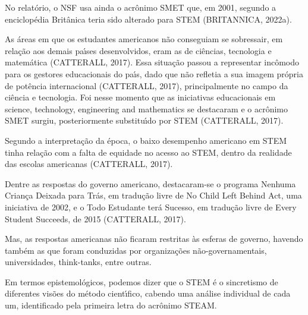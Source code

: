 \documentclass[
12pt,		%
openright,	%
twoside,  %
a4paper,			%
chapter=TITLE,		%
english,			%
french,				%
spanish,			%
brazil				%
]{USPSC-classe/USPSC}
\begin{document}
No relat\'orio, o NSF usa ainda o acr\^onimo SMET que, em 2001, segundo a enciclop\'edia Brit\^anica teria sido alterado para STEM (BRITANNICA, 2022a).








As \'areas em que os estudantes americanos n\~ao conseguiam se sobressair, em rela\c{c}\~ao aos demais pa\'{\i}ses desenvolvidos, eram as de ci\^encias, tecnologia e matem\'atica  (CATTERALL, 2017). Essa situa\c{c}\~ao passou a representar inc\^omodo para os gestores educacionais do pa\'{\i}s, dado que n\~ao refletia a sua imagem pr\'opria de pot\^encia internacional  (CATTERALL, 2017), principalmente no campo da ci\^encia e tecnologia. Foi nesse momento que as iniciativas educacionais em \textquotedbl science, technology, engineering and mathematics se destacaram e o acr\^onimo SMET surgiu, posteriormente substitu\'{\i}do por STEM  (CATTERALL, 2017).








Segundo a interpreta\c{c}\~ao da \'epoca, o baixo desempenho americano em STEM tinha rela\c{c}\~ao com a falta de equidade no acesso ao STEM, dentro da realidade das escolas americanas  (CATTERALL, 2017).








Dentre as respostas do governo americano, destacaram-se o programa \textquotedbl Nenhuma Crian\c{c}a Deixada para Tr\'as\textquotedbl , em tradu\c{c}\~ao livre de \textquotedbl No Child Left Behind Act\textquotedbl , uma iniciativa de 2002, e o \textquotedbl Todo Estudante ter\'a Sucesso\textquotedbl , em tradu\c{c}\~ao livre de \textquotedbl Every Student Succeeds, de 2015  (CATTERALL, 2017).








Mas, as respostas americanas n\~ao ficaram restritas \`as esferas de governo, havendo tamb\'em as que foram conduzidas por organiza\c{c}\~oes n\~ao-governamentais, universidades, think-tanks, entre outras.








Em termos epistemol\'ogicos, podemos dizer que o STEM \'e o sincretismo de diferentes vis\~oes do m\'etodo cient\'{\i}fico, cabendo uma an\'alise individual de cada um, identificado pela primeira letra do acr\^onimo STEAM.
\end{document}
